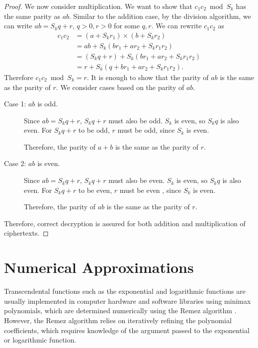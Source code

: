 \begin{proof}
	We now consider multiplication. We want to show that $c_1c_2 \bmod S_k$ has the same parity as $ab$. Similar to the addition case, by the division algorithm, we can write $ab = S_kq + r$, $q > 0, r > 0$ for some $q,r$. We can rewrite $c_1c_2$ as
	\begin{align*}
		c_1c_2 &= (a + S_kr_1) \times (b + S_kr_2)\\
		&= ab + S_k(br_1 + ar_2 + S_kr_1r_2)\\
		&= (S_kq + r) + S_k(br_1 + ar_2 + S_kr_1r_2)\\
		&= r + S_k(q + br_1 + ar_2 + S_kr_1r_2).
	\end{align*}
	Therefore $c_1c_2 \bmod S_k = r$.
	It is enough to show that the parity of $ab$ is the same as the parity of $r$. We consider cases based on the parity of $ab$.
	\begin{description}
		\item[Case 1: $ab$ is odd.]
			Since $ab = S_kq + r$, $S_kq + r$ must also be odd.
			$S_k$ is even, so $S_kq$ is also even.
			For $S_kq + r$ to be odd, $r$ must be odd, since $S_k$ is even.

			Therefore, the parity of $a+b$ is the same as the parity of $r$.
		\item[Case 2: $ab$ is even.]
			Since $ab = S_kq + r$, $S_kq + r$ must also be even.
			$S_k$ is even, so $S_kq$ is also even. For $S_kq + r$ to be even, $r$ must be even , since $S_k$ is even.

			Therefore, the parity of $ab$ is the same as the parity of $r$.
	\end{description}
	Therefore, correct decryption is assured for both addition and multiplication of ciphertexts.
\end{proof}



\section{Numerical Approximations}
\newcommand*\diff{\mathop{}\!\mathrm{d}}

Transcendental functions such as the exponential and logarithmic functions are usually implemented in computer hardware and software libraries using minimax polynomials, which are determined numerically using the Remez algorithm \cite{harrison_computation_1999}.
However, the Remez algorithm relies on iteratively refining the polynomial coefficients, which requires knowledge of the argument passed to the exponential or logarithmic function.


